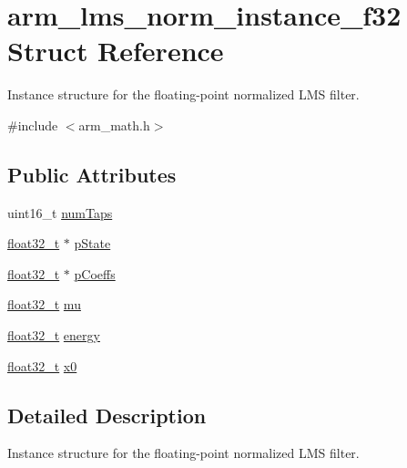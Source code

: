 \hypertarget{structarm__lms__norm__instance__f32}{}\section{arm\+\_\+lms\+\_\+norm\+\_\+instance\+\_\+f32 Struct Reference}
\label{structarm__lms__norm__instance__f32}


Instance structure for the floating-\/point normalized L\+MS filter.  




{\ttfamily \#include $<$arm\+\_\+math.\+h$>$}

\subsection*{Public Attributes}
\begin{DoxyCompactItemize}
\item 
uint16\+\_\+t \hyperlink{structarm__lms__norm__instance__f32_ac95f8ca3d816524c2070643852fac5e8}{num\+Taps}
\item 
\hyperlink{arm__math_8h_a4611b605e45ab401f02cab15c5e38715}{float32\+\_\+t} $\ast$ \hyperlink{structarm__lms__norm__instance__f32_a0bc03338687002ed5f2e4a363eb095ec}{p\+State}
\item 
\hyperlink{arm__math_8h_a4611b605e45ab401f02cab15c5e38715}{float32\+\_\+t} $\ast$ \hyperlink{structarm__lms__norm__instance__f32_a1ba688d90aba7de003ed4ad8e2e7ddda}{p\+Coeffs}
\item 
\hyperlink{arm__math_8h_a4611b605e45ab401f02cab15c5e38715}{float32\+\_\+t} \hyperlink{structarm__lms__norm__instance__f32_a84401d3cfc6c40f69c08223cf341b886}{mu}
\item 
\hyperlink{arm__math_8h_a4611b605e45ab401f02cab15c5e38715}{float32\+\_\+t} \hyperlink{structarm__lms__norm__instance__f32_a6a4119e4f39447bbee31b066deafa16f}{energy}
\item 
\hyperlink{arm__math_8h_a4611b605e45ab401f02cab15c5e38715}{float32\+\_\+t} \hyperlink{structarm__lms__norm__instance__f32_aec958fe89b164a30f38bcca9f5d96218}{x0}
\end{DoxyCompactItemize}


\subsection{Detailed Description}
Instance structure for the floating-\/point normalized L\+MS filter. 

